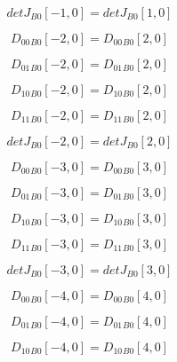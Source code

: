 \documentclass{article}
\begin{document}
\begin{dmath}{detJ{_{B0}}}[{-1,0}] = {detJ{_{B0}}}[{1,0}]\end{dmath}

\begin{dmath}{D_{00}{_{B0}}}[{-2,0}] = {D_{00}{_{B0}}}[{2,0}]\end{dmath}

\begin{dmath}{D_{01}{_{B0}}}[{-2,0}] = {D_{01}{_{B0}}}[{2,0}]\end{dmath}

\begin{dmath}{D_{10}{_{B0}}}[{-2,0}] = {D_{10}{_{B0}}}[{2,0}]\end{dmath}

\begin{dmath}{D_{11}{_{B0}}}[{-2,0}] = {D_{11}{_{B0}}}[{2,0}]\end{dmath}

\begin{dmath}{detJ{_{B0}}}[{-2,0}] = {detJ{_{B0}}}[{2,0}]\end{dmath}

\begin{dmath}{D_{00}{_{B0}}}[{-3,0}] = {D_{00}{_{B0}}}[{3,0}]\end{dmath}

\begin{dmath}{D_{01}{_{B0}}}[{-3,0}] = {D_{01}{_{B0}}}[{3,0}]\end{dmath}

\begin{dmath}{D_{10}{_{B0}}}[{-3,0}] = {D_{10}{_{B0}}}[{3,0}]\end{dmath}

\begin{dmath}{D_{11}{_{B0}}}[{-3,0}] = {D_{11}{_{B0}}}[{3,0}]\end{dmath}

\begin{dmath}{detJ{_{B0}}}[{-3,0}] = {detJ{_{B0}}}[{3,0}]\end{dmath}

\begin{dmath}{D_{00}{_{B0}}}[{-4,0}] = {D_{00}{_{B0}}}[{4,0}]\end{dmath}

\begin{dmath}{D_{01}{_{B0}}}[{-4,0}] = {D_{01}{_{B0}}}[{4,0}]\end{dmath}

\begin{dmath}{D_{10}{_{B0}}}[{-4,0}] = {D_{10}{_{B0}}}[{4,0}]\end{dmath}
\end{document}
